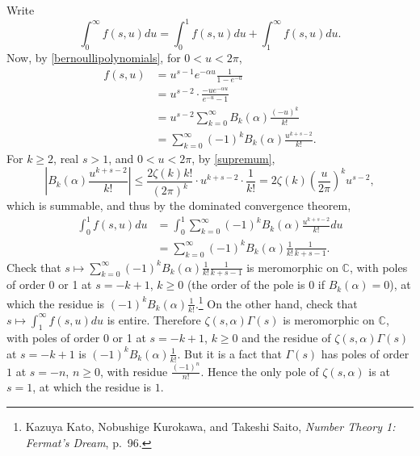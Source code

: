 \documentclass{article}
\theoremstyle{definition}
\theoremstyle{definition}
\begin{document}
Write
\[
\int_0^\infty f(s,u) du = \int_0^1 f(s,u) du + \int_1^\infty f(s,u) du.
\]
Now, by \eqref{bernoullipolynomials}, for $0<u<2\pi$,
\begin{align*}
f(s,u) &= u^{s-1} e^{-\alpha u} \frac{1}{1-e^{-u}}\\
&= u^{s-2} \cdot \frac{-u e^{-\alpha u}}{e^{-u}-1}\\
&=u^{s-2} \sum_{k=0}^\infty B_k(\alpha) \frac{(-u)^k}{k!}\\
&=\sum_{k=0}^\infty (-1)^k B_k(\alpha) \frac{u^{k+s-2}}{k!}.
\end{align*}
For $k \geq 2$, real $s>1$, and $0<u<2\pi$, by \eqref{supremum},
\[
\left| B_k(\alpha) \frac{u^{k+s-2}}{k!} \right| \leq \frac{2\zeta(k) k!}{(2\pi)^k} \cdot u^{k+s-2} \cdot
\frac{1}{k!}
=2\zeta(k)\left( \frac{u}{2\pi} \right)^k u^{s-2},
\]
which is summable,
and thus by the dominated convergence theorem,
\begin{align*}
\int_0^1 f(s,u) du &= \int_0^1 \sum_{k=0}^\infty (-1)^k B_k(\alpha) \frac{u^{k+s-2}}{k!} du\\
&=\sum_{k=0}^\infty (-1)^k B_k(\alpha) \frac{1}{k!} \frac{1}{k+s-1}.
\end{align*}
Check that $s \mapsto \sum_{k=0}^\infty (-1)^k B_k(\alpha) \frac{1}{k!} \frac{1}{k+s-1}$ is meromorphic
on $\mathbb{C}$, with poles of order 0 or 1 at $s=-k+1$, $k \geq 0$ (the order of the pole is $0$ if
$B_k(\alpha)=0$), at which the residue is
$(-1)^k B_k(\alpha) \frac{1}{k!}$.\footnote{Kazuya Kato, Nobushige Kurokawa, 
and Takeshi Saito, {\em Number Theory 1: Fermat's Dream}, p.~96.}
On the other hand, check that $s \mapsto \int_1^\infty f(s,u) du$ is entire. 
Therefore $\zeta(s,\alpha) \Gamma(s)$ is meromorphic on $\mathbb{C}$, with  poles of order 0 or 1 at
$s=-k+1$, $k \geq 0$ and the residue of $\zeta(s,\alpha) \Gamma(s)$ at $s=-k+1$ is $(-1)^k B_k(\alpha) 
\frac{1}{k!}$.
But it is a fact that 
$\Gamma(s)$ has poles of order $1$ at $s=-n$, $n \geq 0$, with residue $\frac{(-1)^n}{n!}$.  
Hence the only pole of $\zeta(s,\alpha)$ is at $s=1$, at which the residue is $1$. 
\end{document}
